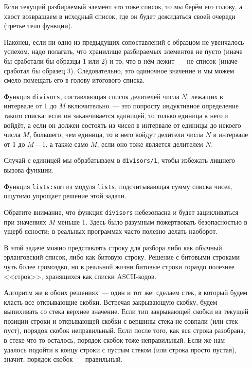 \documentclass[
  paper=a4,
  fontsize=14pt,
  openany,
  appendixprefix=true
]{scrbook}
\begin{document}
Если текущий разбираемый элемент это тоже список, то мы берём его голову, а хвост возвращаем в исходный список, где он будет дожидаться своей очереди (третье тело функции).

Наконец, если ни одно из предыдущих сопоставлений с образцом не увенчалось успехом, надо полагать, что хранилище разбираемых элементов не пусто (иначе бы сработали бы образцы 1 или 2) и то, что в нём лежит~--- не список (иначе сработал бы образец 3). Следовательно, это одиночное значение и мы можем смело помещать его в голову итогового списка.






Функция \lstinline{divisors}, составляющая список делителей числа $N$, лежащих в интервале от 1 до $M$ включительно~--- это попросту индуктивное определение такого списка: если он заканчивается единицей, то только единица в него и войдёт, а если он должен состоять из чисел в интервале от единицы до некоего числа $M$, большего, чем единица, то в него войдут делители числа $N$ в интервале от 1 до $M-1$, а также само $M$, если оно тоже является делителем $N$.

Случай с единицей мы обрабатываем в \lstinline{divisors/1}, чтобы избежать лишнего вызова функции.

Функция \lstinline{lists:sum} из модуля \lstinline{lists}, подсчитывающая сумму списка чисел, ощутимо упрощает решение этой задачи.

Обратите внимание, что функция \lstinline{divisors} небезопасна и будет зацикливаться при значениях $M$ меньше 1. Здесь было разумным пожертвовать безопасностью в ущерб ясности; в реальных программах часто полезно делать наоборот.

\pagebreak

В этой задаче можно представлять строку для разбора либо как обычный эрланговский список, либо как битовую строку. Решение с битовыми строками чуть более громоздко, но в реальной жизни битовые строки гораздо полезнее <<строк>>, хранящихся как списки ASCII-кодов.

Алгоритм же в обоих решениях~--- один и тот же: сделаем стек, в который будем класть все открывающие скобки. Встречая закрывающую скобку, будем выпихивать со стека верхнее значение. Если тип закрывающей скобки из текущей позиции строки и открывающей скобки с вершины стека не совпали (или стек пуст), порядок скобок неправильный. Если после того, как вся строка разобрана, в стеке что-то осталось, порядок скобок тоже неправильный. Если же нам удалось подойти к концу строки с пустым стеком (или строка просто пустая), значит, порядок скобок~--- правильный.
\end{document}
